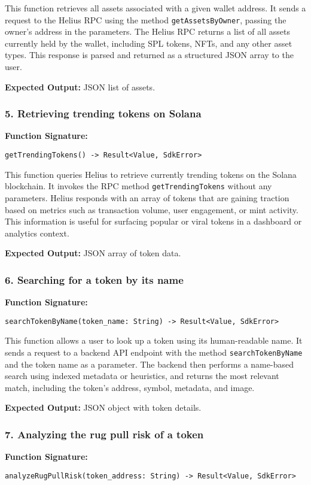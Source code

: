 \documentclass[
]{article}
\begin{document}
This function retrieves all assets associated with a given wallet address. It sends a request to the Helius RPC using the method \texttt{getAssetsByOwner}, passing the owner’s address in the parameters. The Helius RPC returns a list of all assets currently held by the wallet, including SPL tokens, NFTs, and any other asset types. This response is parsed and returned as a structured JSON array to the user.

\textbf{Expected Output:} JSON list of assets.

\subsubsection{5. Retrieving trending tokens on Solana}
\textbf{Function Signature:}
\begin{verbatim}
getTrendingTokens() -> Result<Value, SdkError>
\end{verbatim}

This function queries Helius to retrieve currently trending tokens on the Solana blockchain. It invokes the RPC method \texttt{getTrendingTokens} without any parameters. Helius responds with an array of tokens that are gaining traction based on metrics such as transaction volume, user engagement, or mint activity. This information is useful for surfacing popular or viral tokens in a dashboard or analytics context.

\textbf{Expected Output:} JSON array of token data.

\subsubsection{6. Searching for a token by its name}
\textbf{Function Signature:}
\begin{verbatim}
searchTokenByName(token_name: String) -> Result<Value, SdkError>
\end{verbatim}

This function allows a user to look up a token using its human-readable name. It sends a request to a backend API endpoint with the method \texttt{searchTokenByName} and the token name as a parameter. The backend then performs a name-based search using indexed metadata or heuristics, and returns the most relevant match, including the token’s address, symbol, metadata, and image.

\textbf{Expected Output:} JSON object with token details.

\subsubsection{7. Analyzing the rug pull risk of a token}
\textbf{Function Signature:}
\begin{verbatim}
analyzeRugPullRisk(token_address: String) -> Result<Value, SdkError>
\end{verbatim}
\end{document}

